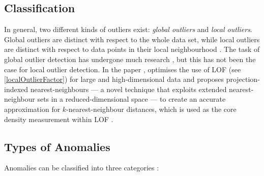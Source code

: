 \subsection{Classification}
\label{anomalyDetection:classification}
In general, two different kinds of outliers exist: \emph{global outliers} and
\emph{local outliers}. Global outliers are distinct with respect to the whole
data set, while local outliers are distinct with respect to data points in their
local neighbourhood \cite{Vries:2011}. The task of global outlier detection has
undergone much research \citeNeeded, but this has not been the case for local
outlier detection. In the paper , \citeauthor{Vries:2011}
optimises the use of \gls{LOF} (see \autoref{localOutlierFactor}) for large and
high-dimensional data and proposes projection-indexed nearest-neighbours --- a
novel technique that exploits extended nearest-neighbour sets in a
reduced-dimensional space --- to create an accurate approximation for
$k$-nearest-neighbour distances, which is used as the core density measurement
within \gls{LOF} \cite{Vries:2011}.

\subsection{Types of Anomalies}
\label{anomalyDetection:types}
Anomalies can be classified into three categories \cite{Chandola:2007}:

